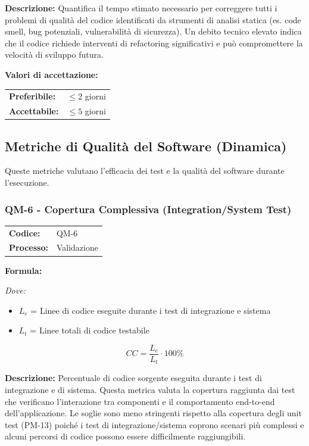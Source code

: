 \documentclass[a4paper,11pt,oneside]{scrartcl}
\begin{document}
\noindent\textbf{Descrizione:} Quantifica il tempo stimato necessario per correggere tutti i problemi di qualità del codice identificati da strumenti di analisi statica (es. code smell{\scriptsize{}}, bug potenziali, vulnerabilità di sicurezza). Un debito tecnico elevato indica che il codice richiede interventi di refactoring significativi e può compromettere la velocità di sviluppo futura.

\vspace{0.2cm}
\noindent\textbf{Valori di accettazione:}
\vspace{0.1cm}

\noindent
\begin{tabular}{@{}ll@{}}
\textbf{Preferibile:} & $\le 2$ giorni \\
\textbf{Accettabile:} & $\le 5$ giorni \\
\end{tabular}


\subsection{Metriche di Qualità del Software (Dinamica)}
Queste metriche valutano l'efficacia dei test e la qualità del software durante l'esecuzione.

\subsubsection{QM-6 - Copertura Complessiva (Integration/System Test)}

\noindent
\begin{tabular}{@{}p{}p{}@{}}
\textbf{Codice:} & QM-6 \\
\textbf{Processo:} & Validazione \\
\end{tabular}

\vspace{0.3cm}
\noindent\textbf{Formula:}

\noindent\textit{Dove:}
\begin{itemize}[leftmargin=1.5cm, topsep=0pt, itemsep=0pt]
    \item $L_e$ = Linee di codice eseguite durante i test di integrazione e sistema
    \item $L_t$ = Linee totali di codice testabile
\end{itemize}

\[
CC = \frac{L_e}{L_t} \cdot 100\%
\]

\noindent\textbf{Descrizione:} Percentuale di codice sorgente eseguita durante i test di integrazione e di sistema. Questa metrica valuta la copertura raggiunta dai test che verificano l'interazione tra componenti e il comportamento end-to-end dell'applicazione. Le soglie sono meno stringenti rispetto alla copertura degli unit test (PM-13) poiché i test di integrazione/sistema coprono scenari più complessi e alcuni percorsi di codice possono essere difficilmente raggiungibili.
\end{document}
